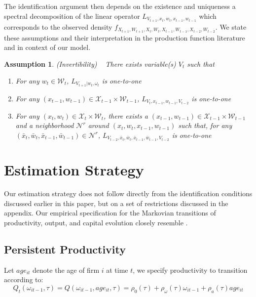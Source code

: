 \documentclass{article}
\newtheorem{assump}{Assumption}[section]
\begin{document}
The identification argument then depends on the existence and uniqueness a spectral decomposition of the linear operator $L_{V_{t+1},x_{t}, w_{t}, x_{t-1}, w_{t-1}}$ which corresponds to the observed density $f_{X_{t+1}, W_{t+1}, X_{t}, W_{t}, X_{t-1}, W_{t-1}, X_{t-2}, W_{t-2}}$. We state these assumptions and their interpretation in the production function literature and in context of our model.

\begin{assump}(Invertibility)
~
There exists variable(s) $V_{t}$ such that
    \begin{enumerate}[label=\alph*)]
    \item For any $w_{t}\in \mathcal{W}_{t}$, $L_{V_{t+1}|w_{t}, \omega_{t}}$ is one-to-one
    \item For any $(x_{t-1}, w_{t-1})\in \mathcal{X}_{t-1}\times\mathcal{W}_{t-1}$, $L_{V_{t}, x_{t-1}, w_{t-1}, V_{t-2}}$ is one-to-one
    \item For any $(x_{t}, w_{t})\in \mathcal{X}_{t}\times\mathcal{W}_{t}$, there exists a $(x_{t-1}, w_{t-1})\in \mathcal{X}_{t-1}\times\mathcal{W}_{t-1}$ and a neighborhood $\mathcal{N}^{r}$ around $(x_{t}, w_{t}, x_{t-1}, w_{t-1})$ such that, for any $(\bar{x}_{t}, \bar{w}_{t}, \bar{x}_{t-1}, \bar{w}_{t-1})\in \mathcal{N}^{r}$, $L_{V_{t-2}, \bar{x}_{t}, \bar{w}_{t}, \bar{x}_{t-1}, \bar{w}_{t-1}, V_{t-2}}$ is one-to-one
    \end{enumerate}
\end{assump}




\section{Estimation Strategy}
Our estimation strategy does not follow directly from the identification conditions discussed earlier in this paper, but on a set of restrictions discussed in the appendix. Our empirical specification for the Markovian transitions of productivity, output, and capital evolution closely resemble \cite{Arellano2017}. 
\subsection{Persistent Productivity}
Let $age_{it}$ denote the age of firm $i$ at time $t$, we specify productivity to transition according to:
\begin{equation}\label{omegamodel}
Q_{t}(\omega_{it-1}, \tau)=Q(\omega_{it-1}, age_{it}, \tau)=\rho_{0}(\tau)+\rho_{\omega}(\tau)\omega_{it-1}+\rho_{a}(\tau)age_{it}
\end{equation}
\end{document}
